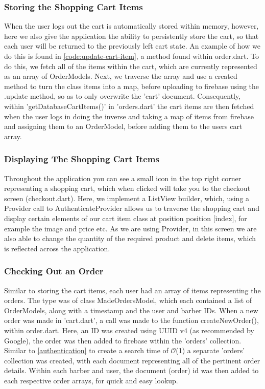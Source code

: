 \documentclass[12pt]{article}
\begin{document}
	\subsubsection{Storing the Shopping Cart Items}
	When the user logs out the cart is automatically stored within memory, however, here we also give the application the ability to persistently store the cart, so that each user will be returned to the previously left cart state. An example of how we do this is found in \autoref{code:update-cart-item}, a method found within order.dart. To do this, we fetch all of the items within the cart, which are currently represented as an array of OrderModels. Next, we traverse the array and use a created method to turn the class items into a map, before uploading to firebase using the .update method, so as to only overwrite the 'cart' document. Consequently, within 'getDatabaseCartItems()' in 'orders.dart' the cart items are then fetched when the user logs in doing the inverse and taking a map of items from firebase and assigning them to an OrderModel, before adding them to the users cart array.
	
	\subsubsection{Displaying The Shopping Cart Items}
	Throughout the application you can see a small icon in the top right corner representing a shopping cart, which when clicked will take you to the checkout screen (checkout.dart). Here, we implement a ListView builder, which, using a Provider call to AuthenticateProvider allows us to traverse the shopping cart and display certain elements of our cart item class at position position [index], for example the image and price etc. As we are using Provider, in this screen we are also able to change the quantity of the required product and delete items, which is reflected across the application.
	

	
	\subsubsection{Checking Out an Order}
	Similar to storing the cart items, each user had an array of items representing the orders. The type was of class MadeOrdersModel, which each contained a list of OrderModels, along with a timestamp and the user and barber IDs. When a new order was made in 'cart.dart', a call was made to the function createNewOrder(), within order.dart. Here, an ID was created using UUID v4 (as recommended by Google), the order was then added to firebase within the 'orders' collection. Similar to \autoref{authentication} to create a search time of $\mathcal{O}$(1) a separate 'orders' collection was created, with each document representing all of the pertinent order details. Within each barber and user, the document (order) id was then added to each respective order arrays, for quick and easy lookup.
	
\end{document}
